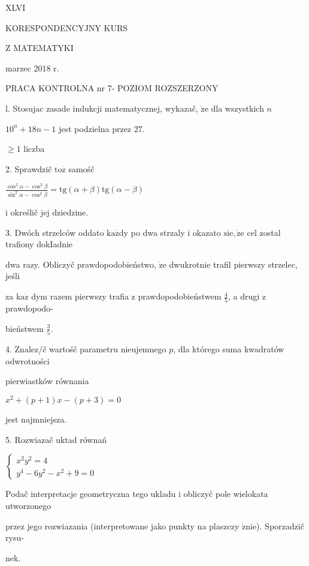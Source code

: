 \documentclass[a4paper,12pt]{article}
\begin{document}
XLVI

KORESPONDENCYJNY KURS

Z MATEMATYKI

marzec 2018 r.

PRACA KONTROLNA nr 7- POZIOM ROZSZERZONY

l. Stosujac zasade indukcji matematycznej, wykazač, $\dot{\mathrm{z}}\mathrm{e}$ dla wszystkich $n$

$10^{n}+18n-1$ jest podzielna przez 27.

$\geq 1$ liczba

2. Sprawdzič $\mathrm{t}\mathrm{o}\dot{\mathrm{z}}$ samośč

$\displaystyle \frac{\cos^{2}\alpha-\cos^{2}\beta}{\sin^{2}\alpha-\cos^{2}\beta}=\mathrm{t}\mathrm{g}(\alpha+\beta)\mathrm{t}\mathrm{g}(\alpha-\beta)$

$\mathrm{i}$ określič jej dziedzine.

3. Dwóch strzelców oddato $\mathrm{k}\mathrm{a}\dot{\mathrm{z}}\mathrm{d}\mathrm{y}$ po dwa strzaly $\mathrm{i}$ okazato $\mathrm{s}\mathrm{i}\mathrm{e}, \dot{\mathrm{z}}\mathrm{e}$ cel zostal trafiony dokIadnie

dwa razy. Obliczyč prawdopodobieństwo, $\dot{\mathrm{z}}\mathrm{e}$ dwukrotnie trafil pierwszy strzelec, jeśli

za $\mathrm{k}\mathrm{a}\dot{\mathrm{z}}$ dym razem pierwszy trafia $\mathrm{z}$ prawdopodobieństwem $\displaystyle \frac{4}{5}$, a drugi $\mathrm{z}$ prawdopodo-

bieństwem $\displaystyle \frac{3}{5}.$

4. Znalez/č wartośč parametru nieujemnego $p$, dla którego suma kwadratów odwrotności

pierwiastków równania

$x^{2}+(p+1)x-(p+3)=0$

jest najmniejsza.

5. Rozwiazač uktad równań

$\left\{\begin{array}{l}
x^{2}y^{2}=4\\
y^{4}-6y^{2}-x^{2}+9=0
\end{array}\right.$

Podač interpretacje geometryczna tego ukladu $\mathrm{i}$ obliczyč pole wielokata utworzonego

przez jego rozwiazania (interpretowane jako punkty na plaszczy $\acute{\mathrm{z}}\mathrm{n}\mathrm{i}\mathrm{e}$). Sporzadzič rysu-

nek.
\end{document}
